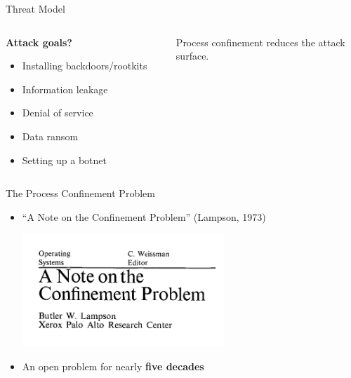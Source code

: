 \documentclass[12pt, dvipsnames, aspectratio=169]{beamer}
\begin{document}
\begin{frame}[c]{Threat Model}
\begin{columns}
    \begin{column}{0.4\textwidth}
        \textbf{Attack goals?}
        \begin{itemize}
            \item Installing backdoors/rootkits
            \item Information leakage
            \item Denial of service
            \item Data ransom
            \item Setting up a botnet
        \end{itemize}
    \end{column}
    \begin{column}{0.6\textwidth}
        \begin{center}
            \Huge
            Process confinement reduces the attack\\surface.
        \end{center}
    \end{column}
\end{columns}
\end{frame}

\begin{frame}[c]{The Process Confinement Problem}
    \begin{itemize}
        \item \enquote{A Note on the Confinement Problem} (Lampson, 1973)
        \begin{center}
            \includegraphics[width=0.6\textwidth]{figs/lampson/1.png}
        \end{center}
        \item An open problem for nearly \textbf{five decades}
    \end{itemize}
\end{frame}

\end{document}
